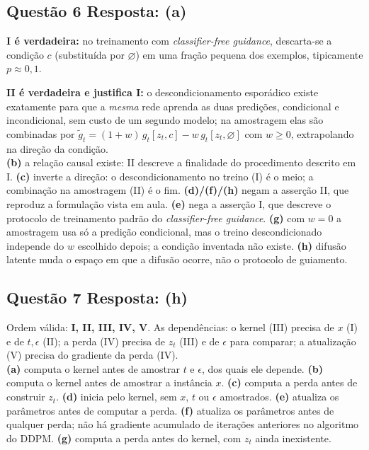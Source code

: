 \documentclass[11pt,a4paper]{article}
\begin{document}
\subsection*{Questão 6 \textemdash{} Resposta: (a)}
\textbf{I é verdadeira:} no treinamento com \textit{classifier-free guidance}, descarta-se a condição $c$ (substituída por $\varnothing$) em uma fração pequena dos exemplos, tipicamente $p \approx 0{,}1$.

\textbf{II é verdadeira e justifica I:} o descondicionamento esporádico existe exatamente para que a \emph{mesma} rede aprenda as duas predições, condicional e incondicional, sem custo de um segundo modelo; na amostragem elas são combinadas por $\tilde{g}_t = (1+w)\,g_t[z_t, c] - w\,g_t[z_t, \varnothing]$ com $w \geq 0$, extrapolando na direção da condição.\\
\textbf{(b)} a relação causal existe: II descreve a finalidade do procedimento descrito em I.
\textbf{(c)} inverte a direção: o descondicionamento no treino (I) é o meio; a combinação na amostragem (II) é o fim.
\textbf{(d)/(f)/(h)} negam a asserção II, que reproduz a formulação vista em aula.
\textbf{(e)} nega a asserção I, que descreve o protocolo de treinamento padrão do \textit{classifier-free guidance}.
\textbf{(g)} com $w = 0$ a amostragem usa só a predição condicional, mas o treino descondicionado independe do $w$ escolhido depois; a condição inventada não existe.
\textbf{(h)} difusão latente muda o espaço em que a difusão ocorre, não o protocolo de guiamento.

\subsection*{Questão 7 \textemdash{} Resposta: (h)}
Ordem válida: \textbf{I, II, III, IV, V}. As dependências: o kernel (III) precisa de $x$ (I) e de $t, \epsilon$ (II); a perda (IV) precisa de $z_t$ (III) e de $\epsilon$ para comparar; a atualização (V) precisa do gradiente da perda (IV).\\
\textbf{(a)} computa o kernel antes de amostrar $t$ e $\epsilon$, dos quais ele depende.
\textbf{(b)} computa o kernel antes de amostrar a instância $x$.
\textbf{(c)} computa a perda antes de construir $z_t$.
\textbf{(d)} inicia pelo kernel, sem $x$, $t$ ou $\epsilon$ amostrados.
\textbf{(e)} atualiza os parâmetros antes de computar a perda.
\textbf{(f)} atualiza os parâmetros antes de qualquer perda; não há gradiente acumulado de iterações anteriores no algoritmo do DDPM.
\textbf{(g)} computa a perda antes do kernel, com $z_t$ ainda inexistente.
\end{document}

